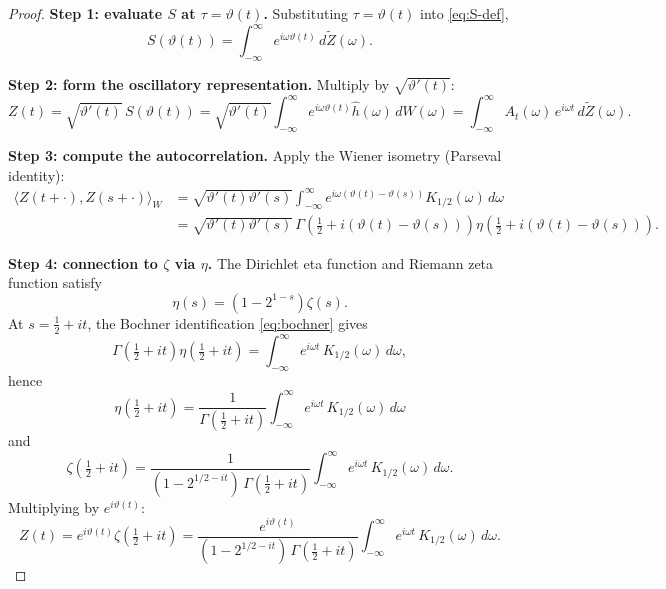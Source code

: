 \documentclass[11pt,a4paper]{article}
\begin{document}
\begin{proof}
\medskip\noindent\textbf{Step 1: evaluate $S$ at $\tau=\vartheta(t)$.}
Substituting $\tau=\vartheta(t)$ into \eqref{eq:S-def},
\begin{equation}
  \label{eq:S-at-theta}
  S(\vartheta(t))
  =\int_{-\infty}^{\infty} e^{i\omega\vartheta(t)}\,d\widetilde{Z}(\omega).
\end{equation}

\medskip\noindent\textbf{Step 2: form the oscillatory representation.}
Multiply by $\sqrt{\vartheta'(t)}$:
\begin{equation}
  \label{eq:Z-expand}
  Z(t)
  =\sqrt{\vartheta'(t)}\,S(\vartheta(t))
  =\sqrt{\vartheta'(t)}\int_{-\infty}^{\infty}
   e^{i\omega\vartheta(t)}\hat{h}(\omega)\,dW(\omega)
  =\int_{-\infty}^{\infty}
   A_t(\omega)\,e^{i\omega t}\,d\widetilde{Z}(\omega).
\end{equation}

\medskip\noindent\textbf{Step 3: compute the autocorrelation.}
Apply the Wiener isometry (Parseval identity):
\begin{align}
  \langle Z(t+\cdot),Z(s+\cdot)\rangle_W
  &=\sqrt{\vartheta'(t)\vartheta'(s)}
    \int_{-\infty}^{\infty}
    e^{i\omega(\vartheta(t)-\vartheta(s))}K_{1/2}(\omega)\,d\omega \\
  \label{eq:Zcov}
  &=\sqrt{\vartheta'(t)\vartheta'(s)}\,
   \Gamma\!\left(\tfrac{1}{2}+i(\vartheta(t)-\vartheta(s))\right)
   \eta\!\left(\tfrac{1}{2}+i(\vartheta(t)-\vartheta(s))\right).
\end{align}

\medskip\noindent\textbf{Step 4: connection to $\zeta$ via $\eta$.}
The Dirichlet eta function and Riemann zeta function satisfy
\begin{equation}
  \label{eq:eta-zeta}
  \eta(s)=(1-2^{1-s})\zeta(s).
\end{equation}
At $s=\tfrac{1}{2}+it$, the Bochner identification \eqref{eq:bochner}
gives
\begin{equation}
  \Gamma\!\left(\tfrac{1}{2}+it\right)
  \eta\!\left(\tfrac{1}{2}+it\right)
  =\int_{-\infty}^{\infty} e^{i\omega t}\,K_{1/2}(\omega)\,d\omega,
\end{equation}
hence
\begin{equation}
  \eta\!\left(\tfrac{1}{2}+it\right)
  =\frac{1}{\Gamma(\tfrac{1}{2}+it)}
   \int_{-\infty}^{\infty} e^{i\omega t}\,K_{1/2}(\omega)\,d\omega
\end{equation}
and
\begin{equation}
  \zeta\!\left(\tfrac{1}{2}+it\right)
  =\frac{1}{(1-2^{1/2-it})\,\Gamma(\tfrac{1}{2}+it)}
   \int_{-\infty}^{\infty} e^{i\omega t}\,K_{1/2}(\omega)\,d\omega.
\end{equation}
Multiplying by $e^{i\vartheta(t)}$:
\begin{equation}
  \label{eq:Z-deterministic}
  Z(t)=e^{i\vartheta(t)}\zeta\!\left(\tfrac{1}{2}+it\right)
  =\frac{e^{i\vartheta(t)}}{(1-2^{1/2-it})\,\Gamma(\tfrac{1}{2}+it)}
   \int_{-\infty}^{\infty} e^{i\omega t}\,K_{1/2}(\omega)\,d\omega.
\end{equation}


\end{proof}
\end{document}
